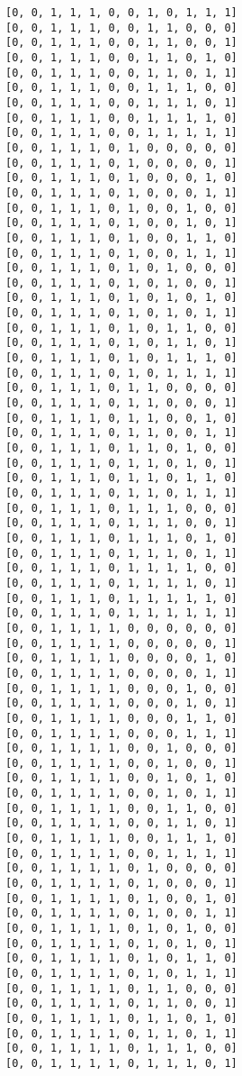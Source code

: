 \documentclass[11pt]{article}
\begin{document}
\begin{Verbatim}[commandchars=\\\{\}]
[0, 0, 1, 1, 1, 0, 0, 1, 0, 1, 1, 1]
[0, 0, 1, 1, 1, 0, 0, 1, 1, 0, 0, 0]
[0, 0, 1, 1, 1, 0, 0, 1, 1, 0, 0, 1]
[0, 0, 1, 1, 1, 0, 0, 1, 1, 0, 1, 0]
[0, 0, 1, 1, 1, 0, 0, 1, 1, 0, 1, 1]
[0, 0, 1, 1, 1, 0, 0, 1, 1, 1, 0, 0]
[0, 0, 1, 1, 1, 0, 0, 1, 1, 1, 0, 1]
[0, 0, 1, 1, 1, 0, 0, 1, 1, 1, 1, 0]
[0, 0, 1, 1, 1, 0, 0, 1, 1, 1, 1, 1]
[0, 0, 1, 1, 1, 0, 1, 0, 0, 0, 0, 0]
[0, 0, 1, 1, 1, 0, 1, 0, 0, 0, 0, 1]
[0, 0, 1, 1, 1, 0, 1, 0, 0, 0, 1, 0]
[0, 0, 1, 1, 1, 0, 1, 0, 0, 0, 1, 1]
[0, 0, 1, 1, 1, 0, 1, 0, 0, 1, 0, 0]
[0, 0, 1, 1, 1, 0, 1, 0, 0, 1, 0, 1]
[0, 0, 1, 1, 1, 0, 1, 0, 0, 1, 1, 0]
[0, 0, 1, 1, 1, 0, 1, 0, 0, 1, 1, 1]
[0, 0, 1, 1, 1, 0, 1, 0, 1, 0, 0, 0]
[0, 0, 1, 1, 1, 0, 1, 0, 1, 0, 0, 1]
[0, 0, 1, 1, 1, 0, 1, 0, 1, 0, 1, 0]
[0, 0, 1, 1, 1, 0, 1, 0, 1, 0, 1, 1]
[0, 0, 1, 1, 1, 0, 1, 0, 1, 1, 0, 0]
[0, 0, 1, 1, 1, 0, 1, 0, 1, 1, 0, 1]
[0, 0, 1, 1, 1, 0, 1, 0, 1, 1, 1, 0]
[0, 0, 1, 1, 1, 0, 1, 0, 1, 1, 1, 1]
[0, 0, 1, 1, 1, 0, 1, 1, 0, 0, 0, 0]
[0, 0, 1, 1, 1, 0, 1, 1, 0, 0, 0, 1]
[0, 0, 1, 1, 1, 0, 1, 1, 0, 0, 1, 0]
[0, 0, 1, 1, 1, 0, 1, 1, 0, 0, 1, 1]
[0, 0, 1, 1, 1, 0, 1, 1, 0, 1, 0, 0]
[0, 0, 1, 1, 1, 0, 1, 1, 0, 1, 0, 1]
[0, 0, 1, 1, 1, 0, 1, 1, 0, 1, 1, 0]
[0, 0, 1, 1, 1, 0, 1, 1, 0, 1, 1, 1]
[0, 0, 1, 1, 1, 0, 1, 1, 1, 0, 0, 0]
[0, 0, 1, 1, 1, 0, 1, 1, 1, 0, 0, 1]
[0, 0, 1, 1, 1, 0, 1, 1, 1, 0, 1, 0]
[0, 0, 1, 1, 1, 0, 1, 1, 1, 0, 1, 1]
[0, 0, 1, 1, 1, 0, 1, 1, 1, 1, 0, 0]
[0, 0, 1, 1, 1, 0, 1, 1, 1, 1, 0, 1]
[0, 0, 1, 1, 1, 0, 1, 1, 1, 1, 1, 0]
[0, 0, 1, 1, 1, 0, 1, 1, 1, 1, 1, 1]
[0, 0, 1, 1, 1, 1, 0, 0, 0, 0, 0, 0]
[0, 0, 1, 1, 1, 1, 0, 0, 0, 0, 0, 1]
[0, 0, 1, 1, 1, 1, 0, 0, 0, 0, 1, 0]
[0, 0, 1, 1, 1, 1, 0, 0, 0, 0, 1, 1]
[0, 0, 1, 1, 1, 1, 0, 0, 0, 1, 0, 0]
[0, 0, 1, 1, 1, 1, 0, 0, 0, 1, 0, 1]
[0, 0, 1, 1, 1, 1, 0, 0, 0, 1, 1, 0]
[0, 0, 1, 1, 1, 1, 0, 0, 0, 1, 1, 1]
[0, 0, 1, 1, 1, 1, 0, 0, 1, 0, 0, 0]
[0, 0, 1, 1, 1, 1, 0, 0, 1, 0, 0, 1]
[0, 0, 1, 1, 1, 1, 0, 0, 1, 0, 1, 0]
[0, 0, 1, 1, 1, 1, 0, 0, 1, 0, 1, 1]
[0, 0, 1, 1, 1, 1, 0, 0, 1, 1, 0, 0]
[0, 0, 1, 1, 1, 1, 0, 0, 1, 1, 0, 1]
[0, 0, 1, 1, 1, 1, 0, 0, 1, 1, 1, 0]
[0, 0, 1, 1, 1, 1, 0, 0, 1, 1, 1, 1]
[0, 0, 1, 1, 1, 1, 0, 1, 0, 0, 0, 0]
[0, 0, 1, 1, 1, 1, 0, 1, 0, 0, 0, 1]
[0, 0, 1, 1, 1, 1, 0, 1, 0, 0, 1, 0]
[0, 0, 1, 1, 1, 1, 0, 1, 0, 0, 1, 1]
[0, 0, 1, 1, 1, 1, 0, 1, 0, 1, 0, 0]
[0, 0, 1, 1, 1, 1, 0, 1, 0, 1, 0, 1]
[0, 0, 1, 1, 1, 1, 0, 1, 0, 1, 1, 0]
[0, 0, 1, 1, 1, 1, 0, 1, 0, 1, 1, 1]
[0, 0, 1, 1, 1, 1, 0, 1, 1, 0, 0, 0]
[0, 0, 1, 1, 1, 1, 0, 1, 1, 0, 0, 1]
[0, 0, 1, 1, 1, 1, 0, 1, 1, 0, 1, 0]
[0, 0, 1, 1, 1, 1, 0, 1, 1, 0, 1, 1]
[0, 0, 1, 1, 1, 1, 0, 1, 1, 1, 0, 0]
[0, 0, 1, 1, 1, 1, 0, 1, 1, 1, 0, 1]

\end{Verbatim}
\end{document}
